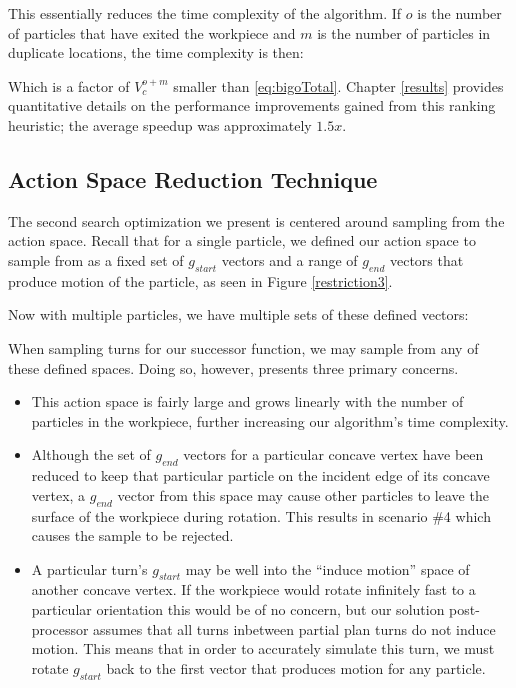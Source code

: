 This essentially reduces the time complexity of the algorithm. If $o$ is the number of particles that have exited the workpiece and $m$ is the number of particles in duplicate locations, the time complexity is then:

 {
  \label{eq:bigoTotalWithHeuristic}
}

Which is a factor of $V_{c}^{o + m}$ smaller than \eqref{eq:bigoTotal}. Chapter \ref{results} provides quantitative details on the performance improvements gained from this ranking heuristic; the average speedup was approximately $1.5x$.

\subsection{Action Space Reduction Technique}

The second search optimization we present is centered around sampling from the action space. Recall that for a single particle, we defined our action space to sample from as a fixed set of $g_{start}$ vectors and a range of $g_{end}$ vectors that produce motion of the particle, as seen in Figure \ref{restriction3}.

Now with multiple particles, we have multiple sets of these defined vectors:


When sampling turns for our successor function, we may sample from any of these defined spaces. Doing so, however, presents three primary concerns.

\begin{itemize}
\item This action space is fairly large and grows linearly with the number of particles in the workpiece, further increasing our algorithm's time complexity.
\item Although the set of $g_{end}$ vectors for a particular concave vertex have been reduced to keep that particular particle on the incident edge of its concave vertex, a $g_{end}$ vector from this space may cause other particles to leave the surface of the workpiece during rotation. This results in scenario \#4 which causes the sample to be rejected.
\item A particular turn's $g_{start}$ may be well into the ``induce motion'' space of another concave vertex. If the workpiece would rotate infinitely fast to a particular orientation this would be of no concern, but our solution post-processor assumes that all turns inbetween partial plan turns do not induce motion. This means that in order to accurately simulate this turn, we must rotate $g_{start}$ back to the first vector that produces motion for any particle.
\end{itemize}


